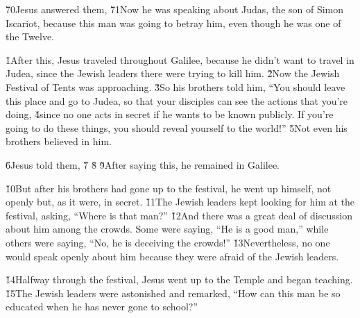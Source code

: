 \v{70}Jesus answered them,  \v{71}Now he was speaking about Judas, the son of Simon Iscariot, because this man was going to betray him, even though he was one of the Twelve.

\v{1}After this, Jesus traveled throughout Galilee, because he didn't want to travel in Judea, since the Jewish leaders there were trying to kill him. \v{2}Now the Jewish Festival of Tents was approaching. \v{3}So his brothers told him, ``You should leave this place and go to Judea, so that your disciples can see the actions that you're doing, \v{4}since no one acts in secret if he wants to be known publicly. If you're going to do these things, you should reveal yourself to the world!'' \v{5}Not even his brothers believed in him.

\v{6}Jesus told them,  \v{7} \v{8} \v{9}After saying this, he remained in Galilee.

\v{10}But after his brothers had gone up to the festival, he went up himself, not openly but, as it were, in secret. \v{11}The Jewish leaders kept looking for him at the festival, asking, ``Where is that man?'' \v{12}And there was a great deal of discussion about him among the crowds. Some were saying, ``He is a good man,'' while others were saying, ``No, he is deceiving the crowds!'' \v{13}Nevertheless, no one would speak openly about him because they were afraid of the Jewish leaders.

\v{14}Halfway through the festival, Jesus went up to the Temple and began teaching. \v{15}The Jewish leaders were astonished and remarked, ``How can this man be so educated when he has never gone to school?''

